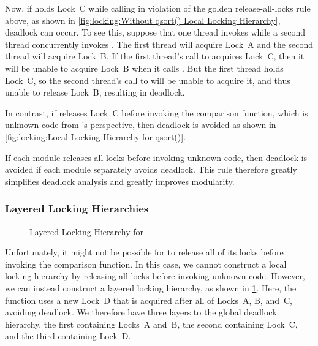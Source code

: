 Now, if  holds Lock~C while calling  in violation
of the golden release-all-locks rule above, as shown in
\cref{fig:locking:Without qsort() Local Locking Hierarchy},
deadlock can occur.
To see this, suppose that one thread invokes  while a second
thread concurrently invokes .
The first thread will acquire Lock~A and the second thread will acquire
Lock~B\@.
If the first thread's call to  acquires Lock~C, then it
will be unable to acquire Lock~B when it calls .
But the first thread holds Lock~C, so the second thread's call to
 will be unable to acquire it, and thus unable to release
Lock~B, resulting in deadlock.

In contrast, if  releases Lock~C before invoking the
comparison function, which is unknown code from 's perspective,
then deadlock is avoided as shown in
\cref{fig:locking:Local Locking Hierarchy for qsort()}.

If each module releases all locks before invoking unknown code, then
deadlock is avoided if each module separately avoids deadlock.
This rule therefore greatly simplifies deadlock analysis and greatly
improves modularity.

\subsubsection{Layered Locking Hierarchies}
\label{sec:locking:Layered Locking Hierarchies}

\begin{figure}
\centering
{}
\caption{Layered Locking Hierarchy for }
\label{fig:locking:Layered Locking Hierarchy for qsort()}
\end{figure}

Unfortunately, it might not be possible for  to release
all of its locks before invoking the comparison function.
In this case, we cannot construct a local locking hierarchy by
releasing all locks before invoking unknown code.
However, we can instead construct a layered locking hierarchy, as shown in
\cref{fig:locking:Layered Locking Hierarchy for qsort()}.
Here, the  function uses a new Lock~D that is acquired after
all of Locks~A, B, and~C, avoiding deadlock.
We therefore have three layers to the global deadlock hierarchy, the
first containing Locks~A and~B, the second containing Lock~C, and
the third containing Lock~D\@.

